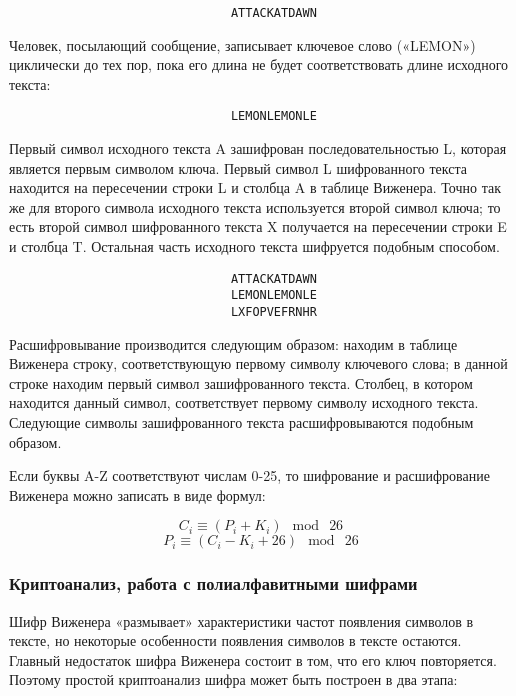 \begin{verbatim}
                               ATTACKATDAWN
\end{verbatim}

Человек, посылающий сообщение, записывает ключевое слово («LEMON») 
циклически до тех пор, пока его длина не будет соответствовать 
длине исходного текста:

\begin{verbatim}
                               LEMONLEMONLE
\end{verbatim}

Первый символ исходного текста A зашифрован последовательностью 
L, которая является первым символом ключа. Первый символ L шифрованного 
текста находится на пересечении строки L и столбца A в таблице 
Виженера. Точно так же для второго символа исходного текста используется 
второй символ ключа; то есть второй символ шифрованного текста 
X получается на пересечении строки E и столбца T. Остальная часть 
исходного текста шифруется подобным способом.

\begin{verbatim}
                               ATTACKATDAWN
                               LEMONLEMONLE
                               LXFOPVEFRNHR
\end{verbatim}

Расшифровывание производится следующим образом: находим в таблице 
Виженера строку, соответствующую первому символу ключевого слова;
в данной строке находим первый символ зашифрованного текста.
Столбец, в котором находится данный символ, соответствует первому 
символу исходного текста. Следующие символы зашифрованного текста 
расшифровываются подобным образом.

Если буквы A-Z соответствуют числам 0-25, то шифрование и 
расшифрование Виженера 
можно записать в виде формул:

    $$C_i \equiv (P_i + K_i) \mod\ 26$$
    $$P_i \equiv (C_i - K_i + 26) \mod\ 26$$

\subsubsection{Криптоанализ, работа с полиалфавитными шифрами}

Шифр Виженера «размывает» характеристики частот появления символов 
в тексте, но некоторые особенности появления символов в тексте 
остаются. Главный недостаток шифра Виженера состоит в том, что 
его ключ повторяется. Поэтому простой криптоанализ шифра может 
быть построен в два этапа:

